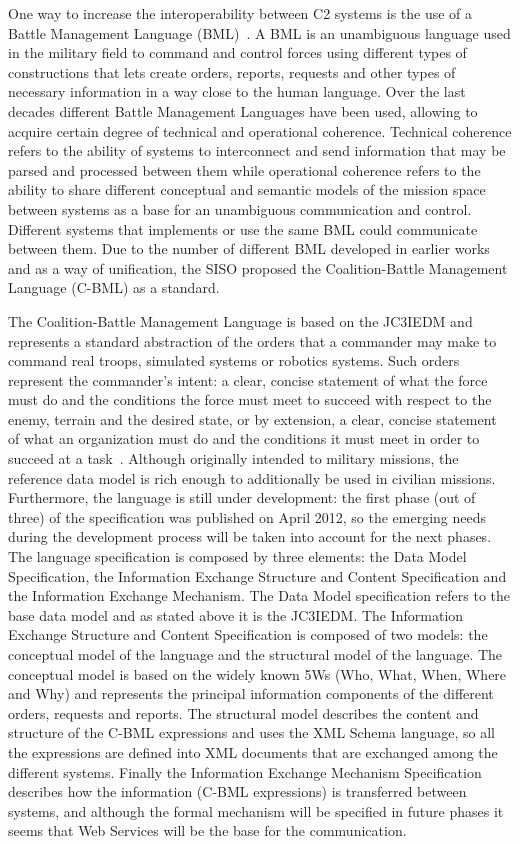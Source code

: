 \documentclass[twocolumn]{svjour3}          %
\begin{document}
One way to increase the interoperability between C2 systems is the use of a Battle Management Language (BML)~\cite{SISO-DRAFT}. A BML is an unambiguous language used in 
the military field to command and control forces using different types of constructions that lets create orders, reports, requests and other
types of necessary information in a way close to the human language. Over the last decades different Battle Management Languages have been used, allowing
to acquire certain degree of technical and operational coherence. Technical coherence refers to the ability of systems to interconnect and send information
that may be parsed and processed between them while operational coherence refers to the ability to share different conceptual and semantic models of the mission
space between systems as a base for an unambiguous communication and control. Different systems that implements or use the same BML could
communicate between them. Due to the number of different BML developed in earlier works and as a way of unification, the SISO proposed the 
Coalition-Battle Management Language (C-BML) as a standard.

The Coalition-Battle Management Language is based on the JC3IEDM and represents a standard abstraction of the orders that a commander
may make to command real troops, simulated systems or robotics systems. Such orders represent the commander's intent: a clear, concise statement
of what the force must do and the conditions the force must meet to succeed with respect to the enemy, terrain and the desired state, or
by extension, a clear, concise statement of what an organization must do and the conditions it must meet in order to succeed at a task~\cite{SISO-DRAFT}.
Although originally intended to military missions, the reference data model is rich enough to additionally be used in civilian missions. Furthermore,
the language is still under development: the first phase (out of three) of the specification was published on April 2012, so the emerging needs during the 
development process will be taken into account for the next phases. The language specification is composed by three elements: the Data Model Specification,
the Information Exchange Structure and Content Specification and the Information Exchange Mechanism. The Data Model specification refers to the base
data model and as stated above it is the JC3IEDM. The Information Exchange Structure and Content Specification is composed of two models: the 
conceptual model of the language and the structural model of the language. The conceptual model is based on the widely known 5Ws (Who, What, 
When, Where and Why) and represents the principal information components of the different orders, requests and reports.
The structural model describes the content and structure of the C-BML expressions and uses the XML Schema language, so all the expressions are defined into XML documents that are exchanged among the different systems. Finally the Information Exchange Mechanism Specification describes how the information (C-BML expressions) is transferred between systems, and although the formal mechanism will be specified in future phases it seems that Web Services will be the base for the communication.
\end{document}

